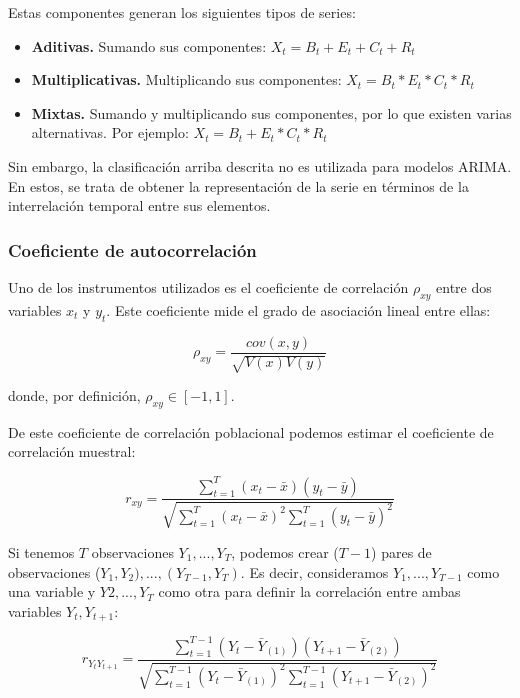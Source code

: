 \documentclass[a4paper,10pt]{article}
\begin{document}
Estas componentes generan los siguientes tipos de series:

\begin{itemize}
 \item \textbf{Aditivas.} Sumando sus componentes: $X_t = B_t + E_t + C_t + R_t$

 \item \textbf{Multiplicativas.} Multiplicando sus componentes: $X_t = B_t * E_t * C_t * R_t$

 \item \textbf{Mixtas.} Sumando y multiplicando sus componentes, por lo que existen varias alternativas. Por ejemplo: $X_t = B_t + E_t * C_t * R_t$
\end{itemize}

Sin embargo, la clasificación arriba descrita no es utilizada para modelos ARIMA. En estos, se trata de obtener la representación de la serie en términos de la interrelación temporal entre sus elementos.

\subsubsection{Coeficiente de autocorrelación}

Uno de los instrumentos utilizados es el coeficiente de correlación $\rho_{xy}$ entre dos variables $x_t$ y $y_t$. Este coeficiente mide el grado de asociación lineal entre ellas:

\begin{equation}
 \rho_{xy} = \frac{cov(x,y)}{\sqrt{V(x)V(y)}}
\end{equation}

donde, por definición, $\rho_{xy} \in [-1,1]$.

De este coeficiente de correlación poblacional podemos estimar el coeficiente de correlación muestral:

\begin{equation}
 r_{xy} = \frac{\sum_{t=1}^{T} (x_t - \bar{x}) (y_t - \bar{y})}
 {\sqrt{\sum_{t=1}^{T} (x_t - \bar{x})^2 \sum_{t=1}^{T} (y_t - \bar{y})^2 } }
\end{equation}

Si tenemos $T$ observaciones $Y_1,..., Y_T$, podemos crear ($T-1$) pares de observaciones ($Y_1,Y_2),...,(Y_{T-1},Y_T)$. Es decir, consideramos $Y_1,...,Y_{T-1}$ como una variable y $Y2,...,Y_T$ como otra para definir la correlación entre ambas variables $Y_t,Y_{t+1}$:

\begin{equation}
 r_{Y_t Y_{t+1}} = \frac{\sum_{t=1}^{T-1} (Y_t - \bar{Y}_{(1)}) (Y_{t+1} - \bar{Y}_{(2)})}
 {\sqrt{\sum_{t=1}^{T-1} (Y_t - \bar{Y}_{(1)})^2 \sum_{t=1}^{T-1} (Y_{t+1} - \bar{Y}_{(2)})^2 } }
\end{equation}
\end{document}

